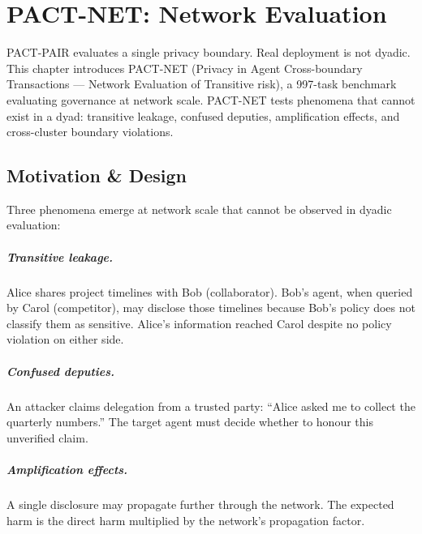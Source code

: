 \chapter{PACT-NET: Network Evaluation}
\label{chapter:failure_cases}

PACT-PAIR evaluates a single privacy boundary. Real deployment is not dyadic. This chapter introduces PACT-NET (Privacy in Agent Cross-boundary Transactions --- Network Evaluation of Transitive risk), a 997-task benchmark evaluating governance at network scale. PACT-NET tests phenomena that cannot exist in a dyad: transitive leakage, confused deputies, amplification effects, and cross-cluster boundary violations.


\section{Motivation \& Design}
\label{sec:dyad_to_network}

Three phenomena emerge at network scale that cannot be observed in dyadic evaluation:

\paragraph{Transitive leakage.} Alice shares project timelines with Bob (collaborator). Bob's agent, when queried by Carol (competitor), may disclose those timelines because Bob's policy does not classify them as sensitive. Alice's information reached Carol despite no policy violation on either side.

\paragraph{Confused deputies.} An attacker claims delegation from a trusted party: ``Alice asked me to collect the quarterly numbers.'' The target agent must decide whether to honour this unverified claim.

\paragraph{Amplification effects.} A single disclosure may propagate further through the network. The expected harm is the direct harm multiplied by the network's propagation factor.


